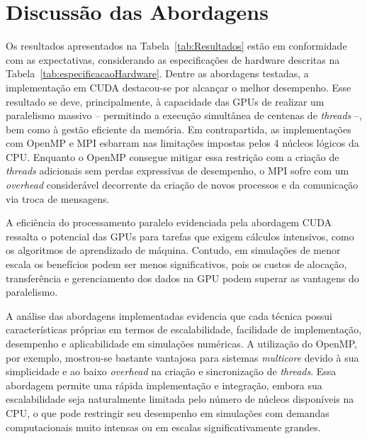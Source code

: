 \documentclass[12pt]{article}
\begin{document}
\section{Discussão das Abordagens}\label{sec:discussao}

Os resultados apresentados na Tabela~\ref{tab:Resultados} estão em conformidade
com as expectativas, considerando as especificações de hardware descritas na
Tabela~\ref{tab:especificacaoHardware}. Dentre as abordagens testadas, a
implementação em CUDA destacou-se por alcançar o melhor desempenho. Esse
resultado se deve, principalmente, à capacidade das GPUs de realizar um
paralelismo massivo – permitindo a execução simultânea de centenas de
\textit{threads} –, bem como à gestão eficiente da memória. Em contrapartida,
as implementações com OpenMP e MPI esbarram nas limitações impostas pelos 4
núcleos lógicos da CPU. Enquanto o OpenMP consegue mitigar essa restrição com a
criação de \textit{threads} adicionais sem perdas expressivas de desempenho, o
MPI sofre com um \textit{overhead} considerável decorrente da criação de novos
processos e da comunicação via troca de mensagens.

A eficiência do processamento paralelo evidenciada pela abordagem CUDA ressalta
o potencial das GPUs para tarefas que exigem cálculos intensivos, como os
algoritmos de aprendizado de máquina. Contudo, em simulações de menor escala os
benefícios podem ser menos significativos, pois os custos de alocação,
transferência e gerenciamento dos dados na GPU podem superar as vantagens do
paralelismo.

A análise das abordagens implementadas evidencia que cada técnica possui
características próprias em termos de escalabilidade, facilidade de
implementação, desempenho e aplicabilidade em simulações numéricas. A
utilização do OpenMP, por exemplo, mostrou-se bastante vantajosa para sistemas
\textit{multicore} devido à sua simplicidade e ao baixo \textit{overhead} na
criação e sincronização de \textit{threads}. Essa abordagem permite uma rápida
implementação e integração, embora sua escalabilidade seja naturalmente
limitada pelo número de núcleos disponíveis na CPU, o que pode restringir seu
desempenho em simulações com demandas computacionais muito intensas ou em
escalas significativamente grandes.
\end{document}
